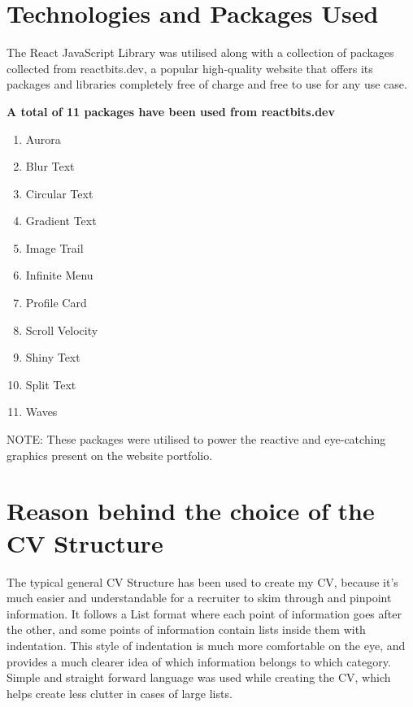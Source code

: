 \documentclass[12pt, letterpaper]{article}
\begin{document}
\section{Technologies and Packages Used}
    The React JavaScript Library was utilised along with a collection of packages collected from reactbits.dev, a popular high-quality website that offers its packages and libraries completely free of charge and free to use for any use case.
    \begin{center}
        \textbf{A total of 11 packages have been used from reactbits.dev}
    \end{center}
    \begin{enumerate}
        \item Aurora
        \item Blur Text
        \item Circular Text
        \item Gradient Text
        \item Image Trail
        \item Infinite Menu
        \item Profile Card
        \item Scroll Velocity
        \item Shiny Text
        \item Split Text
        \item Waves
    \end{enumerate}
    NOTE: These packages were utilised to power the reactive and eye-catching graphics present on the website portfolio.

\section{Reason behind the choice of the CV Structure}
    The typical general CV Structure has been used to create my CV, because it's much easier and understandable for a recruiter to skim through and pinpoint information.
    It follows a List format where each point of information goes after the other, and some points of information contain lists inside them with indentation.
    This style of indentation is much more comfortable on the eye, and provides a much clearer idea of which information belongs to which category.
    Simple and straight forward language was used while creating the CV, which helps create less clutter in cases of large lists.
\end{document}
